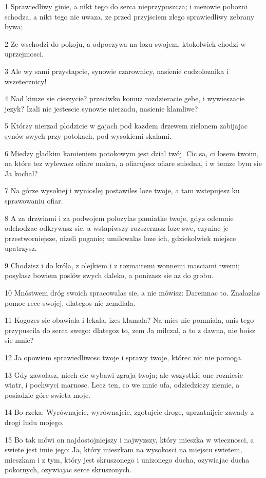 \par 1 Sprawiedliwy ginie, a nikt tego do serca nieprzypuszcza; i mezowie pobozni schodza, a nikt tego nie uwaza, ze przed przyjsciem zlego sprawiedliwy zebrany bywa;
\par 2 Ze wschodzi do pokoju, a odpoczywa na lozu swojem, ktokolwiek chodzi w uprzejmosci.
\par 3 Ale wy sami przystapcie, synowie czarownicy, nasienie cudzoloznika i wszetecznicy!
\par 4 Nad kimze sie cieszycie? przeciwko komuz rozdzieracie gebe, i wywieszacie jezyk? Izali nie jestescie synowie nierzadu, nasienie klamliwe?
\par 5 Którzy nierzad plodzicie w gajach pod kazdem drzewem zielonem zabijajac synów swych przy potokach, pod wysokiemi skalami.
\par 6 Miedzy gladkim kamieniem potokowym jest dzial twój. Cic sa, ci losem twoim, na które tez wylewasz ofiare mokra, a ofiarujesz ofiare sniedna, i w temze bym sie Ja kochal?
\par 7 Na górze wysokiej i wynioslej postawiles loze twoje, a tam wstepujesz ku sprawowaniu ofiar.
\par 8 A za drzwiami i za podwojem polozylas pamiatke twoje, gdyz odemnie odchodzac odkrywasz sie, a wstapiwszy rozszerzasz loze swe, czyniac je przestworniejsze, nizeli poganie; umilowalas loze ich, gdziekolwiek miejsce upatrzysz.
\par 9 Chodzisz i do króla, z olejkiem i z rozmaitemi wonnemi masciami twemi; posylasz bowiem poslów swych daleko, a ponizasz sie az do grobu.
\par 10 Mnóstwem dróg swoich spracowalas sie, a nie mówisz: Daremnac to. Znalazlas pomoc rece swojej, dlategos nie zemdlala.
\par 11 Kogozes sie obawiala i lekala, izes klamala? Na mies nie pomniala, anis tego przypuscila do serca swego: dlategoz to, zem Ja milczal, a to z dawna, nie boisz sie mnie?
\par 12 Ja opowiem sprawiedliwosc twoje i sprawy twoje, którec nic nie pomoga.
\par 13 Gdy zawolasz, niech cie wybawi zgraja twoja; ale wszystkie one rozniesie wiatr, i pochwyci marnosc. Lecz ten, co we mnie ufa, odziedziczy ziemie, a posiadzie góre swieta moje.
\par 14 Bo rzeka: Wyrównajcie, wyrównajcie, zgotujcie droge, uprzatnijcie zawady z drogi ludu mojego.
\par 15 Bo tak mówi on najdostojniejszy i najwyzszy, który mieszka w wiecznosci, a swiete jest imie jego: Ja, który mieszkam na wysokosci na miejscu swietem, mieszkam i z tym, który jest skruszonego i unizonego ducha, ozywiajac ducha pokornych, ozywiajac serce skruszonych.
